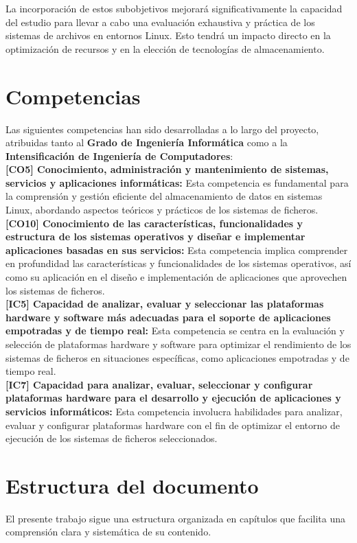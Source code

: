 La incorporación de estos subobjetivos mejorará significativamente la capacidad del estudio para llevar a cabo una evaluación exhaustiva y práctica de los sistemas de archivos en entornos Linux. Esto tendrá un impacto directo en la optimización de recursos y en la elección de tecnologías de almacenamiento.

\section{Competencias}

Las siguientes competencias han sido desarrolladas a lo largo del proyecto, atribuidas tanto al \textbf{Grado de Ingeniería Informática} como a la \textbf{Intensificación de Ingeniería de Computadores}:\\

\textbf{[CO5] Conocimiento, administración y mantenimiento de sistemas, servicios y aplicaciones informáticas:} Esta competencia es fundamental para la comprensión y gestión eficiente del almacenamiento de datos en sistemas Linux, abordando aspectos teóricos y prácticos de los sistemas de ficheros.\\

\textbf{[CO10] Conocimiento de las características, funcionalidades y estructura de los sistemas operativos y diseñar e implementar aplicaciones basadas en sus servicios:} Esta competencia implica comprender en profundidad las características y funcionalidades de los sistemas operativos, así como su aplicación en el diseño e implementación de aplicaciones que aprovechen los sistemas de ficheros.\\

\textbf{[IC5] Capacidad de analizar, evaluar y seleccionar las plataformas hardware y software más adecuadas para el soporte de aplicaciones empotradas y de tiempo real:} Esta competencia se centra en la evaluación y selección de plataformas hardware y software para optimizar el rendimiento de los sistemas de ficheros en situaciones específicas, como aplicaciones empotradas y de tiempo real.\\

\textbf{[IC7] Capacidad para analizar, evaluar, seleccionar y configurar plataformas hardware para el desarrollo y ejecución de aplicaciones y servicios informáticos:} Esta competencia involucra habilidades para analizar, evaluar y configurar plataformas hardware con el fin de optimizar el entorno de ejecución de los sistemas de ficheros seleccionados.

\section{Estructura del documento}
El presente trabajo sigue una estructura organizada en capítulos que facilita una comprensión clara y sistemática de su contenido.


